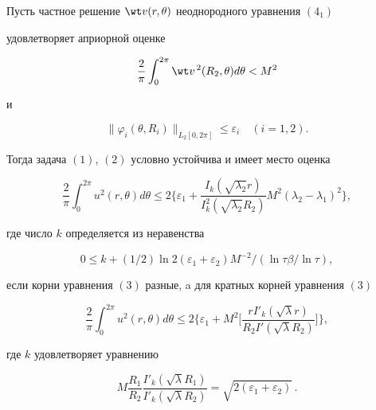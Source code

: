  


\begin{thm} 


Пусть частное решение $\wt v(r,\theta)$ неоднородного уравнения $(4_1)$ 


удовлетворяет априорной оценке 


\begin{equation} 


\frac{2}{\pi}\int^{2\pi}_0\wt v^{\,2}(R_2,\theta)d\theta<M^2 


\end{equation} 


и 


$$ 


\|\varphi_i(\theta,R_i)\|_{L_2[0,2\pi]}\le\varepsilon_i\quad 


(i=1,2). 


$$ 


Тогда задача $(1)$, $(2)$ условно устойчива и имеет место оценка 


\begin{equation} 


\frac{2}{\pi}\int^{2\pi}_0 u^2(r,\theta)d\theta\le 2\bigg\{ 


\varepsilon_1+ 


\frac{I_k(\sqrt{\lambda_2}r)}{I^2_k(\sqrt{\lambda_2}R_2)} 


M^2(\lambda_2-\lambda_1)^2\bigg\}, 


\end{equation} 


где число $k$ определяется из неравенства 


\begin{equation} 


0\le k+(1/2)\ln 2(\varepsilon_1+\varepsilon_2)M^{-2}/ 


(\ln\tau\beta/\ln\tau), 


\end{equation} 


если корни уравнения $(3)$ разные, a для кратных корней уравнения $(3)$ 


\begin{equation} 


\frac{2}{\pi}\int^{2\pi}_0u^2(r,\theta)d\theta\le 2\bigg\{\varepsilon_1+ 


M^2\bigg[ 


\frac{r I'_k(\sqrt{\lambda}r)}{R_2I'(\sqrt{\lambda}R_2)} 


\bigg]\bigg\}, 


\end{equation} 


где $k$ удовлетворяет уравнению 


\begin{equation} 


M\frac{R_1}{R_2} 


\frac{I'_k(\sqrt{\lambda}R_1)}{I'_k(\sqrt{\lambda}R_2)} 


=\sqrt{2(\varepsilon_1+\varepsilon_2)}\,. 


\end{equation} 


\end{thm} 


